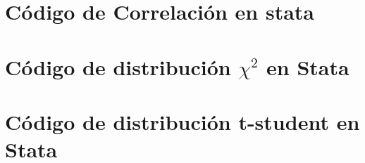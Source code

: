 \documentclass[12pt]{article}
\begin{document}
\section{Código de Correlación en stata}



\section{Código de distribución $\chi^2$ en Stata}



\section{Código de distribución t-student en Stata}


\end{document}

